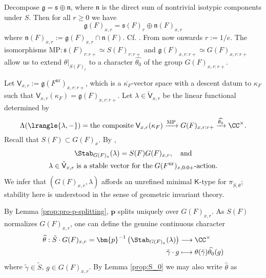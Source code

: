 \documentclass[a4paper,10pt]{article}
\begin{document}
\begin{asparaenum}[1.]
	\item Decompose $\mathfrak{g} = \mathfrak{s} \oplus \mathfrak{n}$, where $\mathfrak{n}$ is the direct sum of nontrivial isotypic components under $S$. Then for all $r \geq 0$ we have
		\[ \mathfrak{g}(F)_{x,r} = \mathfrak{s}(F)_r \oplus \mathfrak{n}(F)_{x,r} \]
		where $\mathfrak{n}(F)_{x,r} := \mathfrak{g}(F)_{x,r} \cap \mathfrak{n}(F)$. Cf. \cite[Proposition 1.9.3]{Adl98}. From now onwards $r := 1/e$. The isomorphisms $\mathrm{MP}: \mathfrak{s}(F)_{r:r+} \simeq S(F)_{r:r+}$ and $\mathfrak{g}(F)_{x, r:r+} \simeq G(F)_{x, r:r+}$ allow us to extend $\theta|_{S(F)_r}$ to a character $\widehat{\theta_0}$ of the group $G(F)_{x, r:r+}$.
	\item Let $\mathsf{V}_{x,r} := \mathfrak{g}(F^\text{nr})_{x, r:r+}$, which is a $\overline{\kappa_F}$-vector space with a descent datum to $\kappa_F$ such that $\mathsf{V}_{x,r}(\kappa_F) = \mathfrak{g}(F)_{x, r:r+}$. Let $\lambda \in \check{\mathsf{V}}_{x,r}$ be the linear functional determined by
		\[ \Lambda(\lrangle{\lambda, -}) = \text{the composite}\; \mathsf{V}_{x,r}(\kappa_F) \xrightarrow{\text{MP}} G(F)_{x, r:r+} \xrightarrow{\widehat{\theta_0}} \CC^\times. \]
		Recall that $S(F) \subset G(F)_x$. By \cite[Proposition 3.4]{Kal15},
		\begin{equation}\label{eqn:lambda-stab}\begin{gathered}
			\Stab_{G(F)_x}(\lambda) = S(F) G(F)_{x, r}, \quad \text{and} \\
			\lambda \in \check{\mathsf{V}}_{x,r} \; \text{is a stable vector for the}\; G(F^\text{nr})_{x,0:0+} \text{-action}.
		\end{gathered}\end{equation}
		We infer that $(G(F)_{x,r}, \lambda)$ affords an unrefined minimal $\mathsf{K}$-type \cite[3.4]{MP96} for $\pi_{\tilde{S}, \theta}$; stability here is understood in the sense of geometric invariant theory.
	\item By Lemma \ref{prop:pro-p-splitting}, $\bm{p}$ splits uniquely over $G(F)_{x,r}$. As $S(F)$ normalizes $G(F)_{x,r}$, one can define the genuine continuous character
		\begin{align*}
			\widehat{\theta}: \tilde{S} \cdot G(F)_{x,r} = \bm{p}^{-1}\left( \Stab_{G(F)_x}(\lambda) \right) & \longrightarrow \CC^\times \\
			\tilde{\gamma} \cdot g & \longmapsto \theta(\tilde{\gamma}) \widehat{\theta_0}(g)
		\end{align*}
		where $\tilde{\gamma} \in \tilde{S}$, $g \in G(F)_{x,r}$. By Lemma \ref{prop:S_0} we may also write $\widehat{\theta}$ as

\end{asparaenum}
\end{document}
